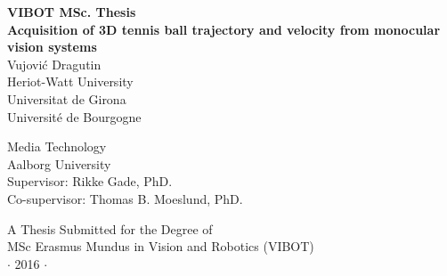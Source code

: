 
\newpage
\thispagestyle{empty}


\vspace*{2cm}
\begin{center}
{\Large\bf VIBOT MSc. Thesis\\Acquisition of 3D tennis ball trajectory and velocity from monocular vision systems\\} \vspace{2cm} {\large
Vujović Dragutin\\
\vspace{1cm}
Heriot-Watt University\\
Universitat de Girona\\
Université de Bourgogne
}
\end{center}

\vspace*{1cm}
\begin{center}
	 {\normalsize
		 Media Technology\\
	 	Aalborg University\\
	 	\vspace{1cm}
		Supervisor: Rikke Gade, PhD.\\
		Co-supervisor: Thomas B. Moeslund, PhD.\\
	}
\end{center}

\vspace{3cm}
\begin{center}
{\large A Thesis Submitted for the Degree of \\MSc Erasmus Mundus
in Vision and Robotics (VIBOT) \\\vspace{0.3cm} $\cdot$ 2016
$\cdot$}
\end{center}
\singlespacing


